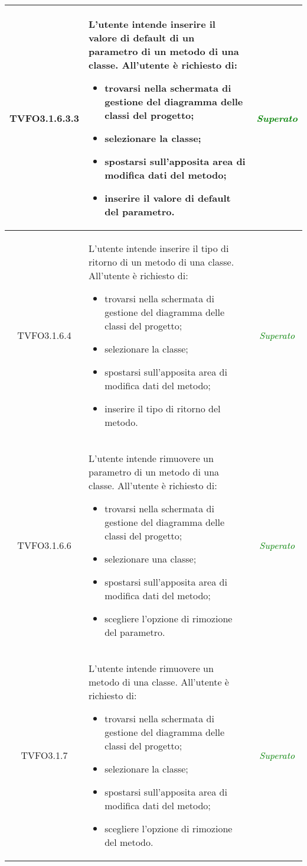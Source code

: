 \begin{longtable}{|c|>{}m{8cm}|c|}
\hypertarget{TVFO3.1.6.3.3}{TVFO3.1.6.3.3} & L'utente intende inserire il valore di default di un parametro di un metodo di una classe.
All'utente è richiesto di:
\begin{itemize}
	\item trovarsi nella schermata di gestione del diagramma delle classi del progetto;
	\item selezionare la classe;
	\item spostarsi sull'apposita area di modifica dati del metodo;
	\item inserire il valore di default del parametro.
\end{itemize} & \textcolor{Green}{\textit{Superato}}\\ \hline

\hypertarget{TVFO3.1.6.4}{TVFO3.1.6.4} & L'utente intende inserire il tipo di ritorno di un metodo di una classe.
All'utente è richiesto di:
\begin{itemize}
	\item trovarsi nella schermata di gestione del diagramma delle classi del progetto;
	\item selezionare la classe;
	\item spostarsi sull'apposita area di modifica dati del metodo;
	\item inserire il tipo di ritorno del metodo.
\end{itemize} & \textcolor{Green}{\textit{Superato}}\\ \hline

\hypertarget{TVFO3.1.6.6}{TVFO3.1.6.6} & L'utente intende rimuovere un parametro di un metodo di una classe.
All'utente è richiesto di:
\begin{itemize}
	\item trovarsi nella schermata di gestione del diagramma delle classi del progetto;
	\item selezionare una classe;
	\item spostarsi sull'apposita area di modifica dati del metodo;
	\item scegliere l'opzione di rimozione del parametro.
\end{itemize} & \textcolor{Green}{\textit{Superato}}\\ \hline

\hypertarget{TVFO3.1.7}{TVFO3.1.7} & L'utente intende rimuovere un metodo di una classe.
All'utente è richiesto di:
\begin{itemize}
	\item trovarsi nella schermata di gestione del diagramma delle classi del progetto;
	\item selezionare la classe;
	\item spostarsi sull'apposita area di modifica dati del metodo;
	\item scegliere l'opzione di rimozione del metodo.
\end{itemize} & \textcolor{Green}{\textit{Superato}}\\ \hline


\end{longtable}
